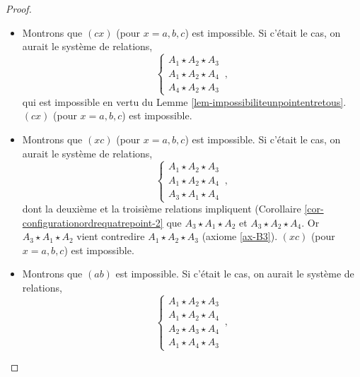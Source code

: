 \begin{cor}
\begin{proof}
        \begin{itemize}[$\bullet$]
            \item Montrons que $(cx)$ (pour $x=a,b,c$) est impossible. Si c'était le cas, on aurait le système de relations,
            \begin{equation*}
                \left\{\begin{array}{cc}
                     A_1 \star A_2 \star A_3  \\
                     A_1 \star A_2 \star A_4  \\
                     A_4 \star A_2 \star A_3
                \end{array}\right.\,,
            \end{equation*}
            qui est impossible en vertu du Lemme \ref{lem-impossibiliteunpointentretous}. $(cx)$ (pour $x=a,b,c$) est impossible.
            \item Montrons que $(xc)$ (pour $x=a,b,c$) est impossible. Si c'était le cas, on aurait le système de relations,
            \begin{equation*}
                \left\{\begin{array}{cc}
                     A_1 \star A_2 \star A_3  \\
                     A_1 \star A_2 \star A_4  \\
                     A_3 \star A_1 \star A_4
                \end{array}\right.\,,
            \end{equation*}
            dont la deuxième et la troisième relations impliquent (Corollaire \ref{cor-configurationordrequatrepoint-2} que $A_3 \star A_1 \star A_2$ et $A_3 \star A_2 \star A_4$. Or $A_3 \star A_1 \star A_2$ vient contredire $A_1 \star A_2 \star A_3$ (axiome \ref{ax-B3}). $(xc)$ (pour $x=a,b,c$)  est impossible.
            \item Montrons que $(ab)$ est impossible. Si c'était le cas, on aurait le système de relations,
            \begin{equation*}
                \left\{\begin{array}{cc}
                     A_1 \star A_2 \star A_3  \\
                     A_1 \star A_2 \star A_4  \\
                     A_2 \star A_3 \star A_4 \\
                     A_1 \star A_4 \star A_3
                \end{array}\right.\,,
            \end{equation*}

\end{itemize}
\end{proof}
\end{cor}
